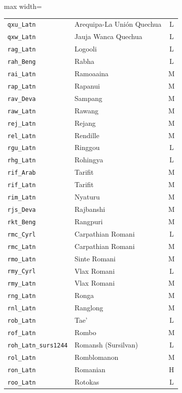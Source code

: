 {\begin{adjustbox}{max width=\textwidth}
\begin{tabular}{llc}
        \texttt{qxu\_Latn} & Arequipa-La Unión Quechua & L \\
        \texttt{qxw\_Latn} & Jauja Wanca Quechua & L \\
        \texttt{rag\_Latn} & Logooli & L \\
        \texttt{rah\_Beng} & Rabha & L \\
        \texttt{rai\_Latn} & Ramoaaina & M \\
        \texttt{rap\_Latn} & Rapanui & M \\
        \texttt{rav\_Deva} & Sampang & M \\
        \texttt{raw\_Latn} & Rawang & M \\
        \texttt{rej\_Latn} & Rejang & M \\
        \texttt{rel\_Latn} & Rendille & M \\
        \texttt{rgu\_Latn} & Ringgou & L \\
        \texttt{rhg\_Latn} & Rohingya & L \\
        \texttt{rif\_Arab} & Tarifit & M \\
        \texttt{rif\_Latn} & Tarifit & M \\
        \texttt{rim\_Latn} & Nyaturu & M \\
        \texttt{rjs\_Deva} & Rajbanshi & M \\
        \texttt{rkt\_Beng} & Rangpuri & M \\
        \texttt{rmc\_Cyrl} & Carpathian Romani & L \\
        \texttt{rmc\_Latn} & Carpathian Romani & M \\
        \texttt{rmo\_Latn} & Sinte Romani & M \\
        \texttt{rmy\_Cyrl} & Vlax Romani & L \\
        \texttt{rmy\_Latn} & Vlax Romani & M \\
        \texttt{rng\_Latn} & Ronga & M \\
        \texttt{rnl\_Latn} & Ranglong & M \\
        \texttt{rob\_Latn} & Tae' & L \\
        \texttt{rof\_Latn} & Rombo & M \\
        \texttt{roh\_Latn\_surs1244} & Romansh (Sursilvan) & L \\
        \texttt{rol\_Latn} & Romblomanon & M \\
        \texttt{ron\_Latn} & Romanian & H \\
        \texttt{roo\_Latn} & Rotokas & L \\

\end{tabular}
\end{adjustbox}}
